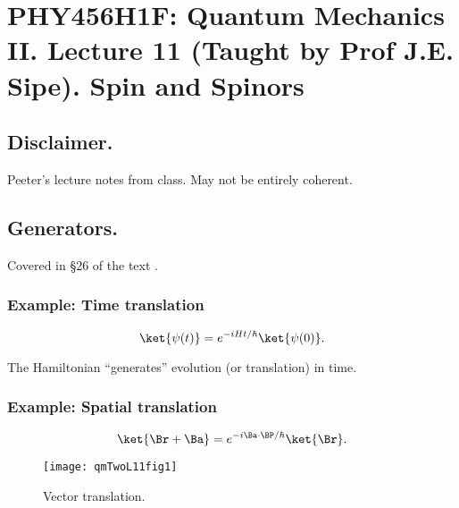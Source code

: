 
%

\chapter{PHY456H1F: Quantum Mechanics II.  Lecture 11 (Taught by Prof J.E. Sipe).  Spin and Spinors}
\label{chap:qmTwoL11}
{}
\date{Oct 17, 2011}

\beginArtWithToc

\section{Disclaimer.}

Peeter's lecture notes from class.  May not be entirely coherent.

\section{Generators.}

Covered in \S 26 of the text \cite{desai2009quantum}.

\subsection{Example: Time translation}

\begin{equation}\label{eqn:qmTwoL11:10}
\ket{\psi(t)} = e^{-i H t/\hbar} \ket{\psi(0)} .
\end{equation}

The Hamiltonian ``generates'' evolution (or translation) in time.

\subsection{Example: Spatial translation}

\begin{equation}\label{eqn:qmTwoL11:30}
\ket{\Br + \Ba} = 
e^{-i \Ba \cdot \BP/\hbar} 
\ket{\Br}.
\end{equation}

\begin{figure}[htp]
   \centering
   \texttt{[image: qmTwoL11fig1]}
   \caption{Vector translation.}
\label{fig:qmTwoL11:qmTwoL11fig1}
\end{figure}


